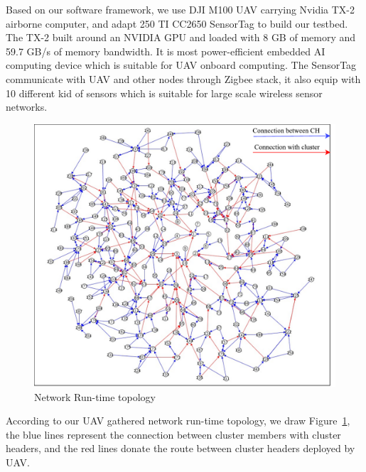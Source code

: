 Based on our software framework, we use DJI M100 UAV carrying Nvidia TX-2 airborne
computer, and adapt 250 TI CC2650 SensorTag to build our testbed. The TX-2 built around an NVIDIA GPU 
and loaded with 8 GB of memory and 59.7 GB/s of memory bandwidth. It is most power-efficient embedded 
AI computing device which is suitable for UAV onboard computing. The SensorTag communicate with UAV and
other nodes through Zigbee stack, it also equip with 10 different kid of sensors which is suitable for 
large scale wireless sensor networks.

\begin{figure}[htbp]
	\centering
	\includegraphics[width=.85\columnwidth]{Figure/topology}
	\vspace{-0.1in}
	\caption{Network Run-time topology}
	\label{topology}
	\vspace{-0.1in}
\end{figure}

According to our UAV gathered network run-time topology, we draw Figure~\ref{topology}, the blue lines
represent the connection between cluster members with cluster headers, and the
red lines donate the route between cluster headers deployed by UAV.

